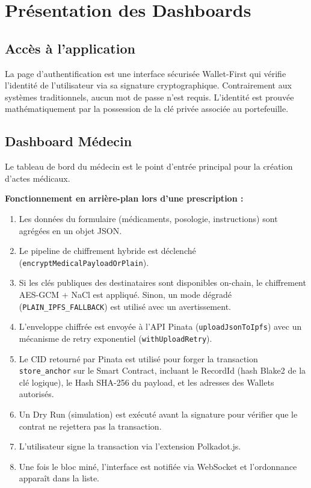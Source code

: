 \documentclass[12pt,a4paper]{report}
\begin{document}
\section{Présentation des Dashboards}

\subsection{Accès à l'application}
La page d'authentification est une interface sécurisée Wallet-First qui vérifie l'identité de l'utilisateur via sa signature cryptographique. Contrairement aux systèmes traditionnels, aucun mot de passe n'est requis. L'identité est prouvée mathématiquement par la possession de la clé privée associée au portefeuille.

\subsection{Dashboard Médecin}
Le tableau de bord du médecin est le point d'entrée principal pour la création d'actes médicaux.

\textbf{Fonctionnement en arrière-plan lors d'une prescription :}
\begin{enumerate}
    \item Les données du formulaire (médicaments, posologie, instructions) sont agrégées en un objet JSON.
    \item Le pipeline de chiffrement hybride est déclenché (\texttt{encryptMedicalPayloadOrPlain}).
    \item Si les clés publiques des destinataires sont disponibles on-chain, le chiffrement AES-GCM + NaCl est appliqué. Sinon, un mode dégradé (\texttt{PLAIN\_IPFS\_FALLBACK}) est utilisé avec un avertissement.
    \item L'enveloppe chiffrée est envoyée à l'API Pinata (\texttt{uploadJsonToIpfs}) avec un mécanisme de retry exponentiel (\texttt{withUploadRetry}).
    \item Le CID retourné par Pinata est utilisé pour forger la transaction \texttt{store\_anchor} sur le Smart Contract, incluant le RecordId (hash Blake2 de la clé logique), le Hash SHA-256 du payload, et les adresses des Wallets autorisés.
    \item Un Dry Run (simulation) est exécuté avant la signature pour vérifier que le contrat ne rejettera pas la transaction.
    \item L'utilisateur signe la transaction via l'extension Polkadot.js.
    \item Une fois le bloc miné, l'interface est notifiée via WebSocket et l'ordonnance apparaît dans la liste.
\end{enumerate}
\end{document}
